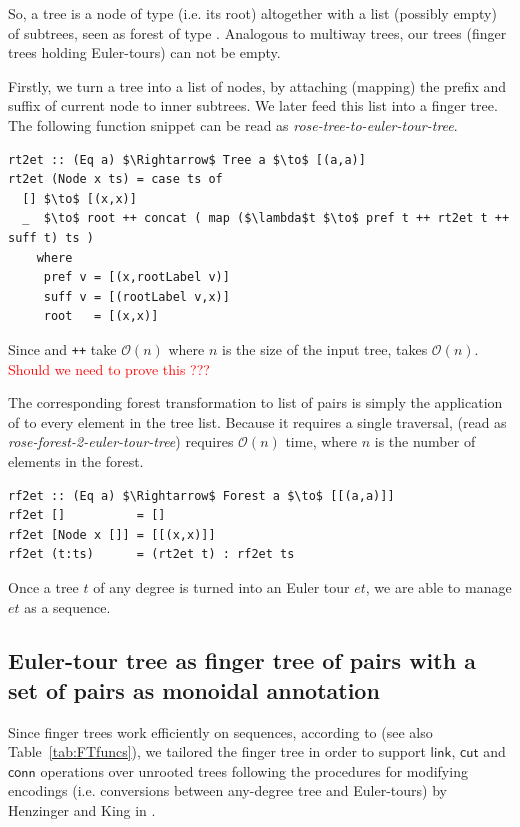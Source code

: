 \documentclass{elsarticle}
\newcommand{\code}[1]{\haskell{#1}}
\newcommand{\tcr} [1]{\textcolor{red}{#1}}
\newcommand{\MATHSF}[1]{\ensuremath{\mathsf{#1}}\xspace}
\newcommand{\link}{\MATHSF{link}}
\newcommand{\cut}{\MATHSF{cut}}
\newcommand{\conn}{\MATHSF{conn}}
\renewcommand{\O}{\ensuremath{\mathcal{O}}}
\begin{document}
So, a tree is a node of type \code{a} (i.e. its root) altogether with a list (possibly empty) of subtrees, seen as forest of type \code{Forest a}. Analogous to multiway trees, our trees (finger trees holding Euler-tours) can not be empty. 

Firstly, we turn a tree into a list of nodes, by attaching (mapping) the prefix and suffix of current node to inner subtrees. We later feed this list into a finger tree. The following function snippet can be read as \textit{rose-tree-to-euler-tour-tree}.

\begin{lstlisting}[mathescape] 
rt2et :: (Eq a) $\Rightarrow$ Tree a $\to$ [(a,a)] 
rt2et (Node x ts) = case ts of
  [] $\to$ [(x,x)]
  _  $\to$ root ++ concat ( map ($\lambda$t $\to$ pref t ++ rt2et t ++ suff t) ts )   
    where
     pref v = [(x,rootLabel v)]
     suff v = [(rootLabel v,x)]
     root   = [(x,x)] 
\end{lstlisting} 

Since \code{concat} and \texttt{++} take $\O(n)$ where $n$ is the size of the input tree, \code{rt2et} takes $\O(n)$. \tcr{Should we need to prove this ???}

The corresponding forest transformation to list of pairs is simply the application of \code{rt2et} to every element in the tree list. Because it requires a single traversal, \code{rf2et} (read as \textit{rose-forest-2-euler-tour-tree}) requires $\O(n)$ time, where $n$ is the number of elements in the forest. 

\begin{lstlisting}[mathescape] 
rf2et :: (Eq a) $\Rightarrow$ Forest a $\to$ [[(a,a)]]
rf2et []          = []
rf2et [Node x []] = [[(x,x)]]  
rf2et (t:ts)      = (rt2et t) : rf2et ts
\end{lstlisting}

Once a tree $t$ of any degree is turned into an Euler tour $et$, we are able to manage $et$ as a sequence. 


\subsection{Euler-tour tree as finger tree of pairs with a set of pairs as monoidal annotation}

Since finger trees work efficiently on sequences, according to \cite{FTs} (see also Table~\ref{tab:FTfuncs}), we tailored the finger tree in order to support \link, \cut and \conn operations over unrooted trees following the procedures for modifying encodings (i.e. conversions between any-degree tree and Euler-tours) by Henzinger and King in \cite{Rand-DynGs-Algos}.
\end{document}
